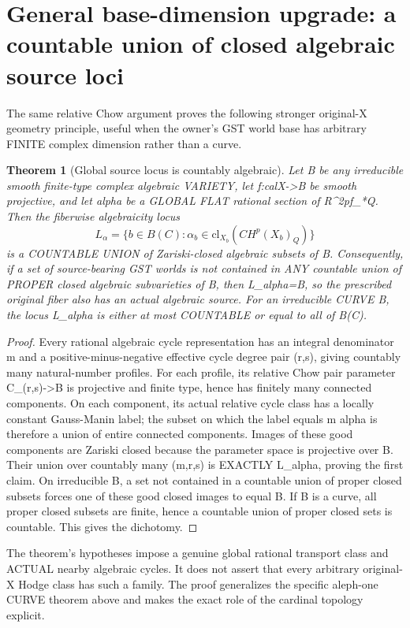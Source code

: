 \documentclass[11pt]{article}
\newtheorem{theorem}{Theorem}
\begin{document}
\section{General base-dimension upgrade: a countable union of closed algebraic source loci}
The same relative Chow argument proves the following
stronger original-X geometry principle, useful when
the owner's GST world base has arbitrary FINITE
complex dimension rather than a curve.

\begin{theorem}[Global source locus is countably algebraic]
Let B be any irreducible smooth finite-type
complex algebraic VARIETY, let
f:calX->B be smooth projective, and let
alpha be a GLOBAL FLAT rational section of
R^{2p}f_*Q. Then the fiberwise
algebraicity locus
\[
L_\alpha=\{b\in B(C):
 \alpha_b\in \mathrm{cl}_{X_b}
           (CH^p(X_b)_Q)\}
\]
is a COUNTABLE UNION of Zariski-closed
algebraic subsets of B. Consequently,
if a set of source-bearing GST worlds is
not contained in ANY countable union of
PROPER closed algebraic subvarieties of B,
then L_alpha=B, so the prescribed original
fiber also has an actual algebraic source.
For an irreducible CURVE B, the locus
L_alpha is either at most COUNTABLE or
equal to all of B(C).
\end{theorem}

\begin{proof}
Every rational algebraic cycle representation
has an integral denominator m and a
positive-minus-negative effective cycle
degree pair (r,s), giving countably
many natural-number profiles.
For each profile, its relative Chow
pair parameter C_(r,s)->B is projective
and finite type, hence has finitely
many connected components.
On each component, its actual relative
cycle class has a locally constant
Gauss-Manin label; the subset on which
the label equals m alpha is therefore
a union of entire connected components.
Images of these good components are
Zariski closed because the parameter
space is projective over B.
Their union over countably many (m,r,s)
is EXACTLY L_alpha, proving the first
claim. On irreducible B, a set not
contained in a countable union of
proper closed subsets forces one of
these good closed images to equal B.
If B is a curve, all proper closed
subsets are finite, hence a countable
union of proper closed sets is
countable. This gives the dichotomy.
\end{proof}

The theorem's hypotheses impose a genuine
global rational transport class and ACTUAL
nearby algebraic cycles. It does not assert
that every arbitrary original-X Hodge
class has such a family. The proof
generalizes the specific aleph-one
CURVE theorem above and makes the exact
role of the cardinal topology explicit.
\end{document}
